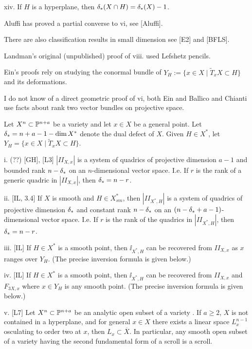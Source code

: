 xiv. If $H$ is a hyperplane,
then $\delta_{*} (X\cap H) = \delta_{*} (X) -1$.
\endproclaim

Aluffi   has proved a partial converse to vi, see [Aluffi].


There are also classification results in small dimension see
[E2] and [BFLS].
 

Landman's original (unpublished) proof of viii. used Lefshetz pencils.  
 
Ein's   proofs rely on studying 
the conormal bundle of $Y_H:=\{x\in X\mid \tilde T_xX\subset H\}$
and its deformations.   
 
I do not know of a direct 
geometric proof of vi, both Ein and Ballico and Chianti use facts
about rank two vector bundles on projective space.

Let $X^n\subset\Bbb P^{n+a}$ be a variety and let
$x\in X$ be a general point.  Let $\delta_{*}= n+a-1-\text{dim}\, X^*$ denote the dual
defect of $X$. 
Given $H\in X^*$, let $Y_H=\{ x\in X\mid \tilde T_xX\subset H\}$.


i. (??) [GH], [L3]   $|II_{X,x}|$
is a system of quadrics of projective dimension $a-1$
 and   bounded rank $n-\delta_{*}$ on an $n$-dimensional vector space.
I.e. If $r$ is the rank of a generic quadric in $|II_{X,x}|$,
then $\delta_{*}= n-r$.  

ii. [IL, 3.4] If $X$ is smooth and $H\in 
X^*_{sm}$, then $|II_{X^*,H}|$ is a system of quadrics of
projective dimension $\delta_{*}$ and constant rank $n-\delta_{*}$
on an $(n-\delta_{*} + a-1)$-dimensional vector space.
I.e. If $r$ is the rank of the quadrics in $|II_{X^*,H}|$,
then $\delta_{*}= n-r$.


iii. [IL]  If $H\in X^*$ is a smooth point,
then $\ii_{X^*,H}$ can be recovered
from
$II_{X,x}$ as $x$ ranges over $Y_H$.
(The precise inversion formula is given below.)


iv. [IL]  If $H\in X^*$ is a smooth point,
then $\ii_{X^*,H}$ can be recovered
from
$II_{X,x}$ and $F_{3 X,x}$ where $x\in Y_H$ is any smooth point.
(The precise inversion formula is given below.)

v. [L7] Let   $X^n\subset\Bbb P^{n+a}$
 be an analytic open subset of a variety . 
 If $a\geq 2$,
$X$ is not contained in a hyperplane, and
for    general 
$x\in X$ there exists  a linear space $L^{n-1}_x$
osculating to order two at $x$, then   $L_x\subset \overline X$.
In particular, any smooth open subset of a variety  having the second
fundamental form
of   a scroll is a scroll.
 

